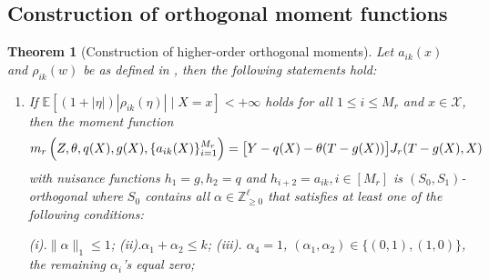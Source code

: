 \documentclass{article}
\def\gX{{\mathcal{X}}}
\newcommand{\E}{\mathbb{E}}
\newtheorem{theorem}{Theorem}[section]
\begin{document}
\subsection{Construction of orthogonal moment functions}
\label{subsec:ortho-moment-construction}
\begin{theorem}[Construction of higher-order orthogonal moments]
    \label{thm:higher-order-orthogonal-moments}
    Let $a_{ik}(x)$ and $\rho_{ik}(w)$ be as defined in , then the following statements hold:
    \begin{enumerate}[(1).]
        \item If $\E\left[(1+|\eta|)|\rho_{ik}(\eta)|\mid X=x\right] < +\infty$ holds for all $1\leq i\leq M_r$ and $x\in\gX$, then the moment function
        \begin{equation}
            \notag
            \begin{aligned}
                m_r\left(Z,\theta,q(X),g(X),\{a_{ik}(X)\}_{i=1}^{M_r}\right) = \big[ Y-q(X)-\theta(T-g(X)) \big] J_r(T-g(X),X)
            \end{aligned}
        \end{equation}
        with nuisance functions $h_1=g, h_2=q$ and $h_{i+2}=a_{ik}, i\in[M_r]$ 
        is $(S_0,S_1)$-orthogonal where $S_0$ contains all $\alpha\in\mathbb{Z}_{\geq 0}^\ell$ that satisfies at least one of the following conditions: 
        
        (i).$\|\alpha\|_1 \leq 1$; (ii).$\alpha_1+\alpha_2 \leq k$;
        (iii). $\alpha_4 = 1$, $(\alpha_1,\alpha_2)\in\{(0,1),(1,0)\}$, the remaining $\alpha_i$'s equal zero; 
        

\end{enumerate}
\end{theorem}
\end{document}
